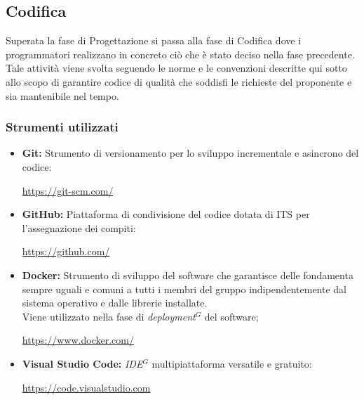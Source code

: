 \subsection{Codifica}
Superata la fase di Progettazione si passa alla fase di Codifica dove i programmatori
realizzano in concreto ciò che è stato deciso nella fase precedente.
Tale attività viene svolta seguendo le norme e le convenzioni descritte qui sotto allo
scopo di garantire codice di qualità che soddisfi le richieste del proponente e sia mantenibile nel tempo.

\subsubsection{Strumenti utilizzati}
    \begin{itemize}
    \item \textbf{Git:} Strumento di versionamento per lo sviluppo incrementale e asincrono del codice:
    \begin{center}
      \url{https://git-scm.com/}
    \end{center}
    \item \textbf{GitHub:} Piattaforma di condivisione del codice dotata di ITS per l'assegnazione dei compiti:
    \begin{center}
      \url{https://github.com/}
    \end{center}
    \item \textbf{Docker:} Strumento di sviluppo del software che garantisce delle fondamenta sempre uguali
      e comuni a tutti i membri del gruppo indipendentemente dal sistema operativo e dalle librerie installate. \\
      Viene utilizzato nella fase di \emph{deployment}$^{G}$ del software;
      \begin{center}
        \url{https://www.docker.com/}
      \end{center}
    \item \textbf{Visual Studio Code:} \emph{IDE}$^{G}$ multipiattaforma versatile e gratuito:
    \begin{center}
      \url{https://code.visualstudio.com}
    \end{center}
    \end{itemize}
